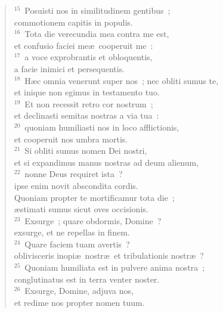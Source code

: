 \begin{verse}
${}^{15}$~Posuisti nos in similitudinem gentibus~;\\ commotionem capitis in populis.\\
${}^{16}$~Tota die verecundia mea contra me est,\\ et confusio faciei me\ae\ cooperuit me~:\\
${}^{17}$~a voce exprobrantis et obloquentis,\\ a facie inimici et persequentis.\\
${}^{18}$~H\ae c omnia venerunt super nos~; nec obliti sumus te,\\ et inique non egimus in testamento tuo.\\
${}^{19}$~Et non recessit retro cor nostrum~;\\ et declinasti semitas nostras a via tua~:\\
${}^{20}$~quoniam humiliasti nos in loco afflictionis,\\ et cooperuit nos umbra mortis.\\
${}^{21}$~Si obliti sumus nomen Dei nostri,\\ et si expandimus manus nostras ad deum alienum,\\
${}^{22}$~nonne Deus requiret ista~?\\ ipse enim novit abscondita cordis.\\ Quoniam propter te mortificamur tota die~;\\ \ae stimati sumus sicut oves occisionis.\\
${}^{23}$~Exsurge~; quare obdormis, Domine~?\\ exsurge, et ne repellas in finem.\\
${}^{24}$~Quare faciem tuam avertis~?\\ oblivisceris inopi\ae\ nostr\ae\ et tribulationis nostr\ae~?\\
${}^{25}$~Quoniam humiliata est in pulvere anima nostra~;\\ conglutinatus est in terra venter noster.\\
${}^{26}$~Exsurge, Domine, adjuva nos,\\ et redime nos propter nomen tuum.\end{verse}



